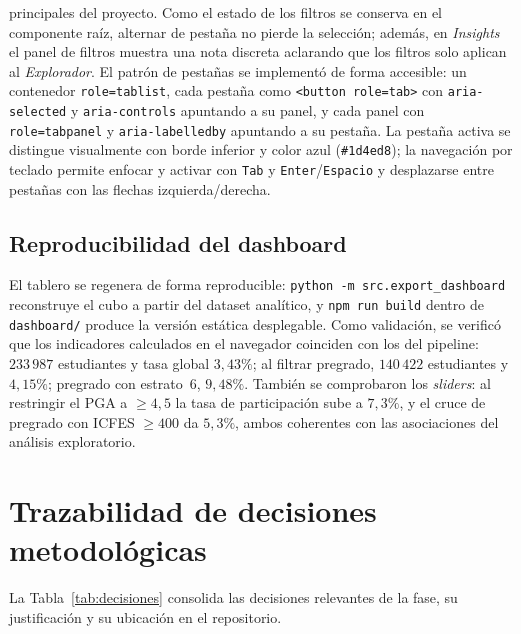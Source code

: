 \documentclass[12pt,a4paper]{article}
\begin{document}
\begin{itemize}[leftmargin=*]
    principales del proyecto. Como el estado de los filtros se conserva en el
    componente raíz, alternar de pestaña no pierde la selección; además, en
    \emph{Insights} el panel de filtros muestra una nota discreta aclarando que los
    filtros solo aplican al \emph{Explorador}. El patrón de pestañas se implementó de
    forma accesible: un contenedor \texttt{role=tablist}, cada pestaña como
    \texttt{<button role=tab>} con \texttt{aria-selected} y \texttt{aria-controls}
    apuntando a su panel, y cada panel con \texttt{role=tabpanel} y
    \texttt{aria-labelledby} apuntando a su pestaña. La pestaña activa se distingue
    visualmente con borde inferior y color azul (\texttt{\#1d4ed8}); la navegación por
    teclado permite enfocar y activar con \texttt{Tab} y \texttt{Enter}/\texttt{Espacio}
    y desplazarse entre pestañas con las flechas izquierda/derecha.
\end{itemize}

\subsection{Reproducibilidad del dashboard}
El tablero se regenera de forma reproducible: \texttt{python -m src.export\_dashboard}
reconstruye el cubo a partir del dataset analítico, y \texttt{npm run build} dentro
de \texttt{dashboard/} produce la versión estática desplegable. Como validación, se
verificó que los indicadores calculados en el navegador coinciden con los del
pipeline: $233\,987$ estudiantes y tasa global $3{,}43\%$; al filtrar pregrado,
$140\,422$ estudiantes y $4{,}15\%$; pregrado con estrato~6, $9{,}48\%$. También se
comprobaron los \emph{sliders}: al restringir el PGA a $\geq 4{,}5$ la tasa de
participación sube a $7{,}3\%$, y el cruce de pregrado con ICFES $\geq 400$ da
$5{,}3\%$, ambos coherentes con las asociaciones del análisis exploratorio.

\section{Trazabilidad de decisiones metodológicas}
\label{sec:trazabilidad}
La Tabla~\ref{tab:decisiones} consolida las decisiones relevantes de la fase, su
justificación y su ubicación en el repositorio.
\end{document}
